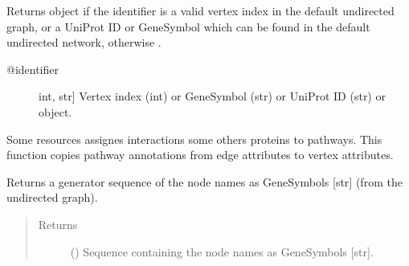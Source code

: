 \documentclass[letterpaper,10pt,english]{sphinxmanual}
\begin{document}
\begin{fulllineitems}

\begin{fulllineitems}
\label{\detokenize{reference:pypath.main.PyPath.v}}
Returns  object if the identifier
is a valid vertex index in the default undirected graph,
or a UniProt ID or GeneSymbol which can be found in the
default undirected network, otherwise .
\begin{description}
\item[{@identifier}] \leavevmode{[}int, str{]}
Vertex index (int) or GeneSymbol (str) or UniProt ID (str) or
 object.

\end{description}

\end{fulllineitems}


\begin{fulllineitems}
\label{\detokenize{reference:pypath.main.PyPath.vertex_pathways}}
Some resources assignes interactions some others proteins to
pathways. This function copies pathway annotations from edge
attributes to vertex attributes.

\end{fulllineitems}


\begin{fulllineitems}
\label{\detokenize{reference:pypath.main.PyPath.vsgs}}
Returns a generator sequence of the node names as GeneSymbols
{[}str{]} (from the undirected graph).
\begin{quote}\begin{description}
\item[{Returns}] \leavevmode
() \textendash{} Sequence containing the node names as
GeneSymbols {[}str{]}.

\end{description}\end{quote}


\end{fulllineitems}
\end{fulllineitems}
\end{document}
